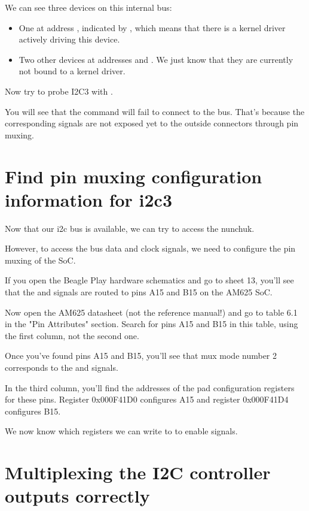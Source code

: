 We can see three devices on this internal bus:
\begin{itemize}
\item One at address , indicated by ,
      which means that there is a kernel driver actively
      driving this device.
\item Two other devices at addresses  and .
      We just know that they are currently not bound to a kernel driver.
\end{itemize}

Now try to probe I2C3 with .

You will see that the command will fail to connect to
the bus. That's because the corresponding signals are
not exposed yet to the outside connectors through pin muxing.

\section{Find pin muxing configuration information for i2c3}

Now that our i2c bus is available, we can try to access the nunchuk.

However, to access the bus data and clock signals, we need to configure
the pin muxing of the SoC.

If you open the Beagle Play hardware schematics and go to sheet 13,
you'll see that the  and  signals are routed to pins
A15 and B15 on the AM625 SoC.

Now open the AM625 datasheet (not the reference manual!) and go to
table 6.1 in the "Pin Attributes" section. Search for pins A15 and
B15 in this table, using the first column, not the second one.

Once you've found pins A15 and B15, you'll see that mux mode number 2
corresponds to the  and  signals.

In the third column, you'll find the addresses of the pad configuration
registers for these pins. Register 0x000F41D0 configures A15 and register
0x000F41D4 configures B15.


We now know which registers we can write to to enable 
signals.

\section{Multiplexing the I2C controller outputs correctly}

